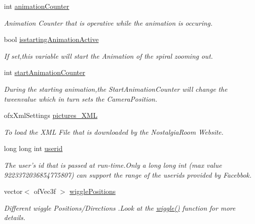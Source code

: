 \begin{DoxyCompactItemize}
int \hyperlink{group___camera_animation_ga21b16bdba744425519597fcb925df43a}{animation\-Counter}
\begin{DoxyCompactList}\small\item\em Animation Counter that is operative while the animation is occuring. \end{DoxyCompactList}\item 
bool \hyperlink{group___camera_animation_gab8a277e1055730fb5d6786ce0c4804b2}{isstarting\-Animation\-Active}
\begin{DoxyCompactList}\small\item\em If set,this variable will start the Animation of the spiral zooming out. \end{DoxyCompactList}\item 
int \hyperlink{group___camera_animation_ga577bf117cf10109de967ea0d3ca17f1f}{start\-Animation\-Counter}
\begin{DoxyCompactList}\small\item\em During the starting animation,the Start\-Animation\-Counter will change the tweenvalue which in turn sets the Camera\-Position. \end{DoxyCompactList}\item 
ofx\-Xml\-Settings \hyperlink{classtest_app_a85133f49103cfa002f39d882f7168236}{pictures\-\_\-\-X\-M\-L}
\begin{DoxyCompactList}\small\item\em To load the X\-M\-L File that is downloaded by the Nostalgia\-Room Website. \end{DoxyCompactList}\item 
long long int \hyperlink{classtest_app_a6ae76dc97fbeee00755f4a6cd6b87e19}{userid}
\begin{DoxyCompactList}\small\item\em The user's id that is passed at run-\/time.\-Only a long long int (max value 9223372036854775807) can support the range of the userids provided by Facebbok. \end{DoxyCompactList}\item 
vector$<$ of\-Vec3f $>$ \hyperlink{group___wiggle_ga5495d37f44bb3e3b00a04ad5910e0a6b}{wiggle\-Positions}
\begin{DoxyCompactList}\small\item\em Different wiggle Positions/\-Directions .Look at the \hyperlink{group___wiggle_gacd718eb54b9dc2b45e463414c24de6b9}{wiggle()} function for more details. \end{DoxyCompactList}\item 

\end{DoxyCompactItemize}
